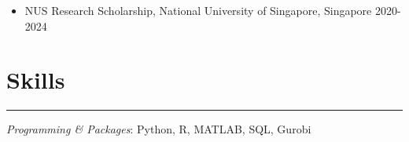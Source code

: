 \documentclass[12pt, a4paper]{article}
\begin{document}
{\begin{itemize}[leftmargin=26pt, itemsep=1pt, parsep=0.5pt, topsep=1pt]
	\item NUS Research Scholarship, National University of Singapore, Singapore \hfill 2020-2024
	



\end{itemize}




\section*{Skills}
\vspace*{0.4em}
\hrule height 0.5pt

\textit{Programming \& Packages}: Python, R, MATLAB, SQL, Gurobi


}

\end{document}
